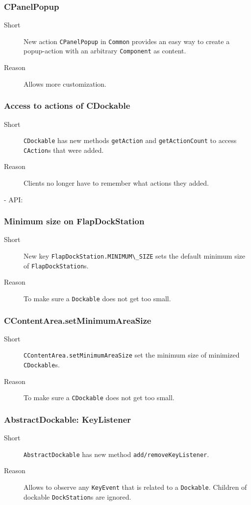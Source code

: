 \documentclass[a4paper,10pt]{article}
\newcommand{\src}[1]{\lstinline[basicstyle=\normalsize\ttfamily,keywordstyle=\normalsize\ttfamily,identifierstyle=\normalsize\ttfamily]|#1|}
\newcommand{\short}{\item[Short]}
\newcommand{\why}{\item[Reason]}
\begin{document}
\subsubsection{CPanelPopup}
\begin{description}
 \short New action \src{CPanelPopup} in \src{Common} provides an easy way to create a popup-action with an arbitrary \src{Component} as content.
 \why Allows more customization.
\end{description}

\subsubsection{Access to actions of CDockable}
\begin{description}
 \short \src{CDockable} has new methods \src{getAction} and \src{getActionCount} to access \src{CAction}s that were added. 
 \why Clients no longer have to remember what actions they added.
\end{description}

- API: 
\subsubsection{Minimum size on FlapDockStation}
\begin{description}
 \short New key \src{FlapDockStation.MINIMUM\_SIZE} sets the default minimum size of \src{FlapDockStation}s.
 \why To make sure a \src{Dockable} does not get too small.
\end{description}

\subsubsection{CContentArea.setMinimumAreaSize}
\begin{description}
 \short \src{CContentArea.setMinimumAreaSize} set the minimum size of minimized \src{CDockable}s.
 \why To make sure a \src{CDockable} does not get too small.
\end{description}

\subsubsection{AbstractDockable: KeyListener}
\begin{description}
 \short \src{AbstractDockable} has new method \src{add/removeKeyListener}.
 \why Allows to observe any \src{KeyEvent} that is related to a \src{Dockable}. Children of dockable \src{DockStation}s are ignored.
\end{description}
\end{document}
